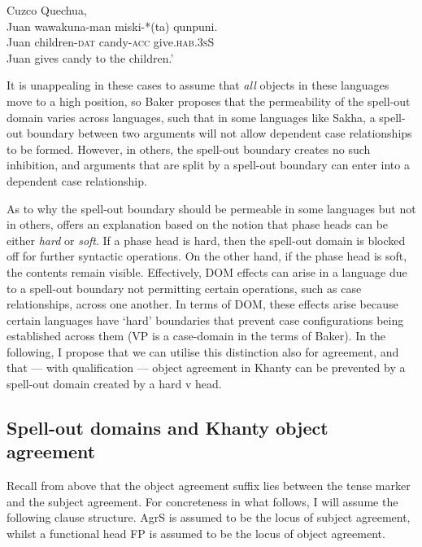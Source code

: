 \documentclass[output=paper
,modfonts
,nonflat]{langsci/langscibook}
\begin{document}
\begin{exe}
\ex Cuzco Quechua, \citet[][146]{Baker2015}\\
\gll Juan wawakuna-man miski-*(ta) qunpuni.\\
Juan children-\textsc{dat} candy-\textsc{acc} give.\textsc{hab.3sS}\\
\glt Juan gives candy to the children.'
\end{exe}
 
\noindent It is unappealing in these cases to assume that \emph{all} objects in these languages move to a high position, so Baker proposes that the permeability of the spell-out domain varies across languages, such that in some languages like Sakha, a spell-out boundary between two arguments will not allow dependent case relationships to be formed. 
However, in others, the spell-out boundary creates no such inhibition, and arguments that are split by a spell-out boundary can enter into a dependent case relationship. 

As to why the spell-out boundary should be permeable in some languages but not in others, \citeauthor{Baker2015} offers an explanation based on the notion that phase heads can be either \emph{hard} or \emph{soft}. 
If a phase head is hard, then the spell-out domain is blocked off for further syntactic operations. 
On the other hand, if the phase head is soft, the contents remain visible. 
Effectively, DOM effects can arise in a language due to a spell-out boundary not permitting certain operations, such as case relationships, across one another. 
In terms of DOM, these effects arise because certain languages have `hard' boundaries that prevent case configurations being established across them (VP is a case-domain in the terms of Baker).
In the following, I propose that we can utilise this distinction also for agreement, and that --- with qualification --- object agreement in Khanty can be prevented by a spell-out domain created by a hard v head.


\subsection{Spell-out domains and Khanty object agreement}

Recall from above that the object agreement suffix lies between the tense marker and the subject agreement. For concreteness in what follows, I will assume the following clause structure. AgrS is assumed to be the locus of subject agreement, whilst a functional head FP is assumed to be the locus of object agreement.
\end{document}
